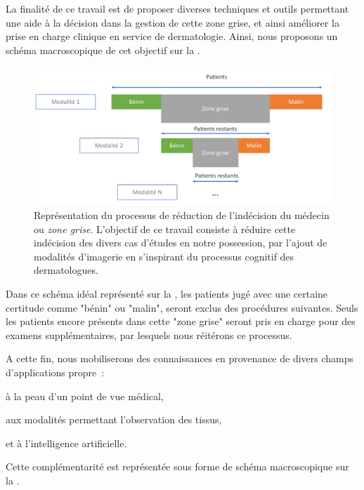 La finalité de ce travail est de proposer diverses techniques et outils permettant une aide à la décision dans la gestion de cette zone grise, et ainsi améliorer la prise en charge clinique en service de dermatologie. Ainsi, nous proposons un schéma macroscopique de cet objectif sur la .\par

\begin{figure}[H]
    \centering
    \includegraphics[width=\linewidth]{contents/i_introduction/resources/scheme_reduce_indecision.pdf}
    \caption{Représentation du processus de réduction de l'indécision du médecin ou \textit{zone grise}. L'objectif de ce travail consiste à réduire cette indécision des divers cas d'études en notre possession, par l'ajout de modalités d'imagerie en s'inspirant du processus cognitif des dermatologues.}
    \label{fig:scheme_reduce_indecision}
\end{figure}\par

Dans ce schéma idéal représenté sur la , les patients jugé avec une certaine certitude comme "bénin" ou "malin", seront exclus des procédures suivantes. Seuls les patients encore présents dans cette "zone grise" seront pris en charge pour des examens supplémentaires, par lesquels nous réitérons ce processus.\par 

A cette fin, nous mobiliserons des connaissances en provenance de divers champs d'applications propre~:
\begin{inlinerate}
    \item à la peau d'un point de vue médical, 
    \item aux modalités permettant l'observation des tissus,
    \item et à l'intelligence artificielle.
\end{inlinerate} Cette complémentarité est représentée sous forme de schéma macroscopique sur la .\par

